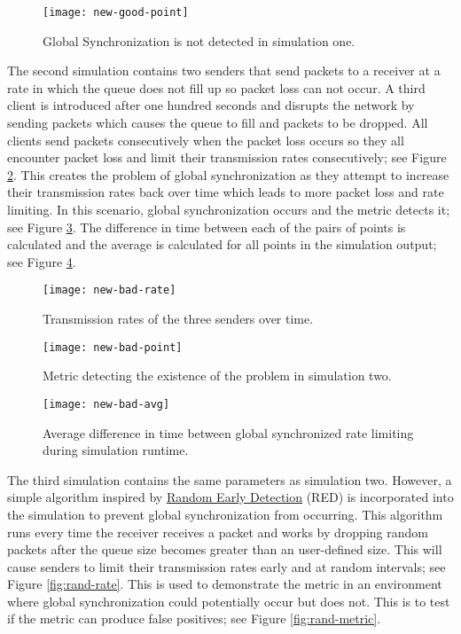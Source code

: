 \documentclass{article}
\newcommand{\plotsize}{0.23}
\begin{document}
\begin{figure}[H]
	\centering
	\texttt{[image: new-good-point]}
	\caption{Global Synchronization is not detected in simulation one.}
	\label{fig:good-metric}
\end{figure}

The second simulation contains two senders that send packets to a receiver at a rate in which the queue does not fill up so packet loss can not occur. A third client is introduced after one hundred seconds and disrupts the network by sending packets which causes the queue to fill and packets to be dropped. All clients send packets consecutively when the packet loss occurs so they all encounter packet loss and limit their transmission rates consecutively; see Figure \ref{fig:bad-rate}. This creates the problem of global synchronization as they attempt to increase their transmission rates back over time which leads to more packet loss and rate limiting. In this scenario, global synchronization occurs and the metric detects it; see Figure \ref{fig:bad-metric}. The difference in time between each of the pairs of points is calculated and the average is calculated for all points in the simulation output; see Figure \ref{fig:bad-avg}.

\begin{figure}[H]
	\centering
	\texttt{[image: new-bad-rate]}
	\caption{Transmission rates of the three senders over time.}
	\label{fig:bad-rate}
\end{figure}

\begin{figure}[H]
	\centering
	\texttt{[image: new-bad-point]}
	\caption{Metric detecting the existence of the problem in simulation two.}
	\label{fig:bad-metric}
\end{figure}

\begin{figure}[H]
	\centering
	\texttt{[image: new-bad-avg]}
	\caption{Average difference in time between global synchronized rate limiting during simulation runtime.}
	\label{fig:bad-avg}
\end{figure}		

The third simulation contains the same parameters as simulation two. However, a simple algorithm inspired by \href{https://en.wikipedia.org/wiki/Random_early_detection}{Random Early Detection} (RED) is incorporated into the simulation to prevent global synchronization from occurring. This algorithm runs every time the receiver receives a packet and works by dropping random packets after the queue size becomes greater than an user-defined size. This will cause senders to limit their transmission rates early and at random intervals; see Figure \ref{fig:rand-rate}. This is used to demonstrate the metric in an environment where global synchronization could potentially occur but does not. This is to test if the metric can produce false positives; see Figure \ref{fig:rand-metric}.
\end{document}
